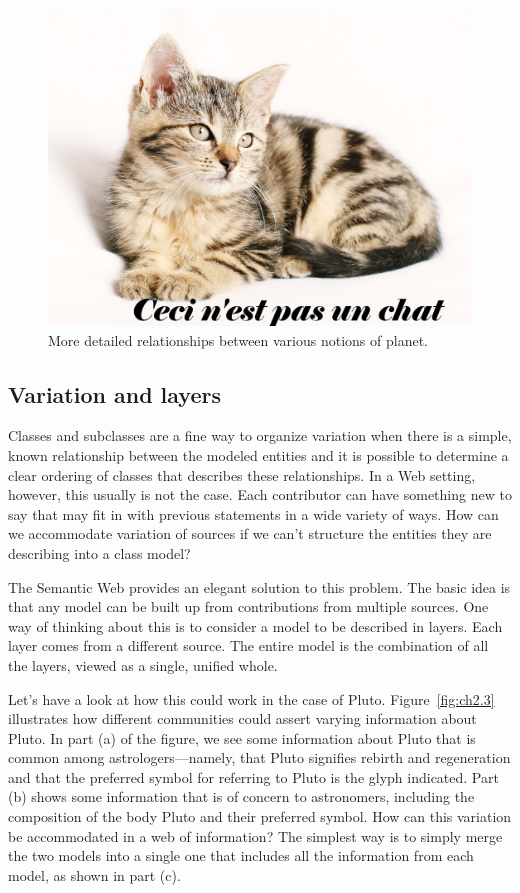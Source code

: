 \begin{figure}
    \centering
    \includegraphics[width=5.0in]{media/imageX.jpg}
    \caption{More detailed relationships between various notions of planet.}
    \label{fig:ch2.2}
\end{figure}


\subsection{Variation and layers}

Classes and subclasses are a fine way to organize variation when there
is a simple, known relationship between the modeled entities and it is
possible to determine a clear ordering of classes that describes these
relationships. In a Web setting, however, this usually is not the case.
Each contributor can have something new to say that may fit in with
previous statements in a wide variety of ways. How can we accommodate
variation of sources if we can't structure the entities they are
describing into a class model?

The Semantic Web provides an elegant solution to this problem. The basic
idea is that any model can be built up from contributions from multiple
sources. One way of thinking about this is to consider a model to be
described in layers. Each layer comes from a different source. The
entire model is the combination of all the layers, viewed as a single,
unified whole.

Let's have a look at how this could work in the case of Pluto. Figure~\ref{fig:ch2.3} 
illustrates how different communities could assert varying
information about Pluto. In part (a) of the figure, we see some
information about Pluto that is common among astrologers---namely, that
Pluto signifies rebirth and regeneration and that the preferred symbol
for referring to Pluto is the glyph indicated. Part (b) shows some
information that is of concern to astronomers, including the composition
of the body Pluto and their preferred symbol. How can this variation be
accommodated in a web of information? The simplest way is to simply
merge the two models into a single one that includes all the information
from each model, as shown in part (c).

